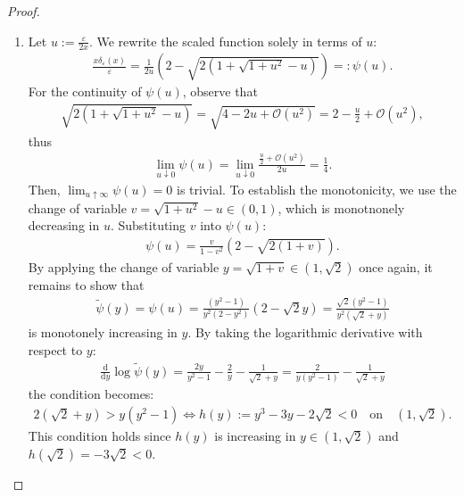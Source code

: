 \documentclass[noinfoline]{imsart}\setcounter{tocdepth}{2}
\renewcommand{\c}[1]{\mathcal{#1}}
\newcommand{\rd}{\mathrm{d}}
\theoremstyle{plain}
\begin{document}
\begin{appendix}
\begin{proof}
\begin{enumerate}[leftmargin = *]
\item Let $u := \frac{\varepsilon}{2x}$. We rewrite the scaled function solely in terms of $u$:
\begin{align*}
    \frac{x \delta_{\varepsilon}(x)}{\varepsilon} = \frac{1}{2u} \left( 2 - \sqrt{2\left(1 + \sqrt{1+u^2}-u \right)} \right) =: \psi(u).
\end{align*}
For the continuity of $\psi(u)$, observe that
\begin{align*}
    \sqrt{2\left(1 + \sqrt{1+u^2}-u \right)} = \sqrt{4 - 2u + \c{O}(u^{2})} = 2 - \frac{u}{2} + \c{O}(u^{2}), 
\end{align*}
thus
\begin{align*}
    \lim_{u \downarrow 0} \psi(u) = \lim_{u \downarrow 0} \frac{\frac{u}{2} + \c{O}(u^{2})}{2u} = \frac{1}{4}.
\end{align*}
Then, $\lim_{u \uparrow \infty} \psi(u) = 0$ is trivial.
To establish the monotonicity, we use the change of variable $v = \sqrt{1+u^2}-u \in (0, 1)$, which is monotnonely decreasing in $u$. Substituting $v$ into $\psi(u)$:
\begin{align*} 
    \psi(u) = \frac{v}{1-v^2} \left( 2 - \sqrt{2(1+v)} \right). 
\end{align*}
By applying the change of variable $y = \sqrt{1+v} \in (1, \sqrt{2})$ once again, it remains to show that
\begin{align*}
    \tilde{\psi}(y) = \psi(u) = \frac{(y^{2}-1)}{y^2(2-y^2)} \left( 2 - \sqrt{2} y \right) = \frac{\sqrt{2} (y^{2}-1)}{y^2(\sqrt{2}+y)}  
\end{align*}
is monotonely increasing in $y$. By taking the logarithmic derivative with respect to $y$:
\begin{align*}
    \frac{\rd}{\rd y} \log \tilde{\psi}(y) = \frac{2y}{y^2-1} - \frac{2}{y} - \frac{1}{\sqrt{2}+y} = \frac{2}{y (y^2-1)} - \frac{1}{\sqrt{2}+y}
\end{align*}
the condition becomes: 
\begin{align*} 
    2(\sqrt{2}+y) > y (y^2-1) \iff h(y):= y^3 - 3y - 2\sqrt{2} < 0 \quad \text{on} \quad (1, \sqrt{2}). 
\end{align*}
This condition holds since $h(y)$ is increasing in $y \in (1, \sqrt{2})$ and $h(\sqrt{2}) = -3 \sqrt{2} < 0$.
\end{enumerate}
\end{proof}

\end{appendix}
\end{document}
